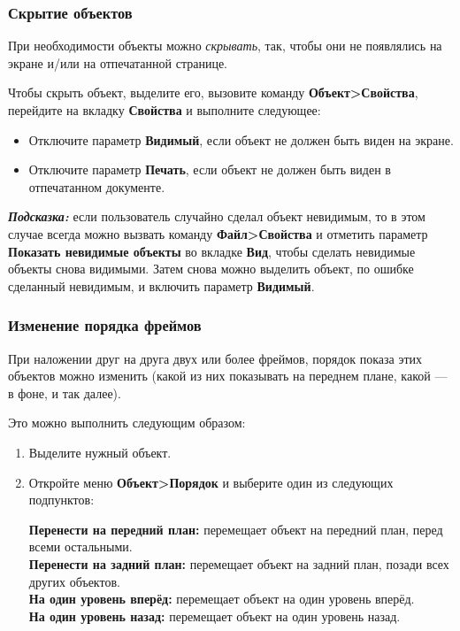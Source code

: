 ﻿\documentclass[a4paper,10pt]{article}
\begin{document}
\subsubsection{Скрытие объектов}
При необходимости объекты можно \textit{скрывать}, так, чтобы они не появлялись на экране и/или на отпечатанной странице.

Чтобы скрыть объект, выделите его, вызовите команду \textbf{Объект>Свойства}, перейдите на вкладку \textbf{Свойства} и выполните следующее:
\begin{itemize}
 \item Отключите параметр \textbf{Видимый}, если объект не должен быть виден на экране.
 \item Отключите параметр \textbf{Печать}, если объект не должен быть виден в отпечатанном документе.
\end{itemize}

\textit{\textbf{Подсказка:}} если пользователь случайно сделал объект невидимым, то в этом случае всегда можно вызвать команду \textbf{Файл>Свойства} и отметить параметр \textbf{Показать невидимые объекты} во вкладке \textbf{Вид}, чтобы сделать невидимые объекты снова видимыми. Затем снова можно выделить объект, по ошибке сделанный невидимым, и включить параметр \textbf{Видимый}.

\subsubsection{Изменение порядка фреймов}
При наложении друг на друга двух или более фреймов, порядок показа этих объектов можно изменить (какой из них показывать на переднем плане, какой — в фоне, и так далее).

Это можно выполнить следующим образом:

\begin{enumerate}
 \item Выделите нужный объект.
 \item Откройте меню \textbf{Объект>Порядок} и выберите один из следующих подпунктов:
 
 \textbf{Перенести на передний план:} перемещает объект на передний план, перед всеми остальными.\\
 \textbf{Перенести на задний план:} перемещает объект на задний план, позади всех других объектов.\\
 \textbf{На один уровень вперёд:} перемещает объект на один уровень вперёд.\\
 \textbf{На один уровень назад:} перемещает объект на один уровень назад.\\
\end{enumerate}
\end{document}
